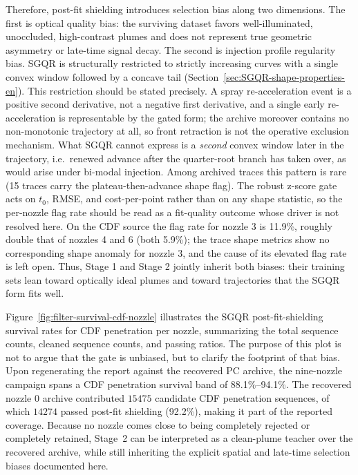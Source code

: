 Therefore, post-fit shielding introduces selection bias along two dimensions. The first is optical quality bias: the surviving dataset favors well-illuminated, unoccluded, high-contrast plumes and does not represent true geometric asymmetry or late-time signal decay. The second is injection profile regularity bias. SGQR is structurally restricted to strictly increasing curves with a single convex window followed by a concave tail (Section~\ref{sec:SGQR-shape-properties-en}). This restriction should be stated precisely. A spray re-acceleration event is a positive second derivative, not a negative first derivative, and a single early re-acceleration is representable by the gated form; the archive moreover contains no non-monotonic trajectory at all, so front retraction is not the operative exclusion mechanism. What SGQR cannot express is a \emph{second} convex window later in the trajectory, i.e.\ renewed advance after the quarter-root branch has taken over, as would arise under bi-modal injection. Among archived traces this pattern is rare (15 traces carry the plateau-then-advance shape flag). The robust z-score gate acts on \(t_0\), RMSE, and cost-per-point rather than on any shape statistic, so the per-nozzle flag rate should be read as a fit-quality outcome whose driver is not resolved here. On the CDF source the flag rate for nozzle 3 is 11.9\%, roughly double that of nozzles 4 and 6 (both 5.9\%); the trace shape metrics show no corresponding shape anomaly for nozzle 3, and the cause of its elevated flag rate is left open. Thus, Stage 1 and Stage 2 jointly inherit both biases: their training sets lean toward optically ideal plumes and toward trajectories that the SGQR form fits well.

Figure~\ref{fig:filter-survival-cdf-nozzle} illustrates the SGQR post-fit-shielding survival rates for CDF penetration per nozzle, summarizing the total sequence counts, cleaned sequence counts, and passing ratios. The purpose of this plot is not to argue that the gate is unbiased, but to clarify the footprint of that bias. Upon regenerating the report against the recovered PC archive, the nine-nozzle campaign spans a CDF penetration survival band of 88.1\%--94.1\%. The recovered nozzle 0 archive contributed \(\num{15475}\) candidate CDF penetration sequences, of which \(\num{14274}\) passed post-fit shielding (92.2\%), making it part of the reported coverage. Because no nozzle comes close to being completely rejected or completely retained, Stage~2 can be interpreted as a clean-plume teacher over the recovered archive, while still inheriting the explicit spatial and late-time selection biases documented here.

